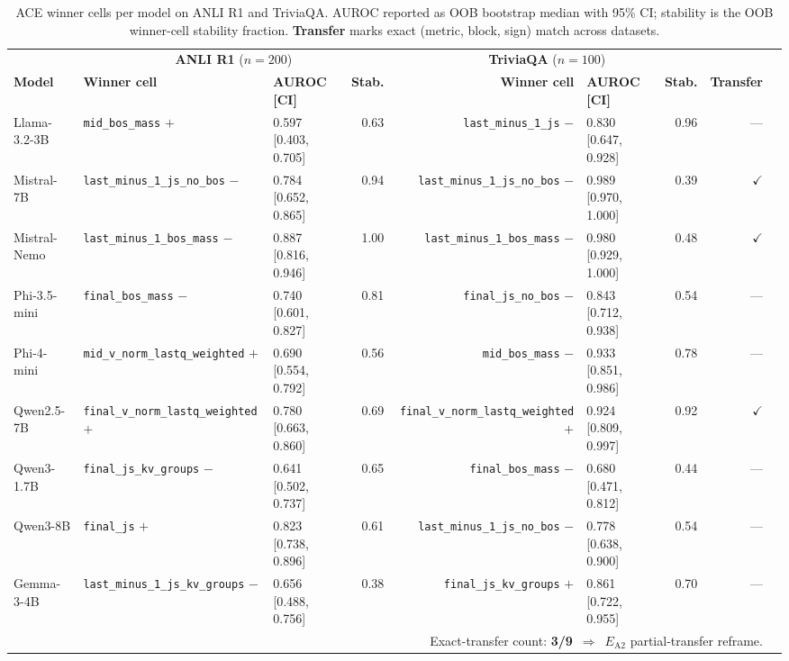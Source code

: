 \documentclass[10pt, letterpaper]{article}
\newcommand{\ea}[1]{$E_{\text{A}#1}$}
\begin{document}
\begin{table}[t]
\centering
\caption{ACE winner cells per model on ANLI R1 and TriviaQA. AUROC
reported as OOB bootstrap median with 95\% CI; stability is the OOB
winner-cell stability fraction. \textbf{Transfer} marks exact
(metric, block, sign) match across datasets.}
\label{tab:ace_winner_cells}
\small
\setlength{\tabcolsep}{4pt}
\begin{tabular}{@{}lllrrlrrc@{}}
\toprule
 & \multicolumn{3}{c}{\textbf{ANLI R1} ($n{=}200$)} & \multicolumn{3}{c}{\textbf{TriviaQA} ($n{=}100$)} & \\
\cmidrule(lr){2-4} \cmidrule(lr){5-7}
\textbf{Model} & \textbf{Winner cell} & \textbf{AUROC [CI]} & \textbf{Stab.} & \textbf{Winner cell} & \textbf{AUROC [CI]} & \textbf{Stab.} & \textbf{Transfer} \\
\midrule
Llama-3.2-3B & \texttt{mid\_bos\_mass} $+$ & 0.597 [0.403, 0.705] & 0.63 & \texttt{last\_minus\_1\_js} $-$ & 0.830 [0.647, 0.928] & 0.96 & --- \\
Mistral-7B & \texttt{last\_minus\_1\_js\_no\_bos} $-$ & 0.784 [0.652, 0.865] & 0.94 & \texttt{last\_minus\_1\_js\_no\_bos} $-$ & 0.989 [0.970, 1.000] & 0.39 & $\checkmark$ \\
Mistral-Nemo & \texttt{last\_minus\_1\_bos\_mass} $-$ & 0.887 [0.816, 0.946] & 1.00 & \texttt{last\_minus\_1\_bos\_mass} $-$ & 0.980 [0.929, 1.000] & 0.48 & $\checkmark$ \\
Phi-3.5-mini & \texttt{final\_bos\_mass} $-$ & 0.740 [0.601, 0.827] & 0.81 & \texttt{final\_js\_no\_bos} $-$ & 0.843 [0.712, 0.938] & 0.54 & --- \\
Phi-4-mini & \texttt{mid\_v\_norm\_lastq\_weighted} $+$ & 0.690 [0.554, 0.792] & 0.56 & \texttt{mid\_bos\_mass} $-$ & 0.933 [0.851, 0.986] & 0.78 & --- \\
Qwen2.5-7B & \texttt{final\_v\_norm\_lastq\_weighted} $+$ & 0.780 [0.663, 0.860] & 0.69 & \texttt{final\_v\_norm\_lastq\_weighted} $+$ & 0.924 [0.809, 0.997] & 0.92 & $\checkmark$ \\
Qwen3-1.7B & \texttt{final\_js\_kv\_groups} $-$ & 0.641 [0.502, 0.737] & 0.65 & \texttt{final\_bos\_mass} $-$ & 0.680 [0.471, 0.812] & 0.44 & --- \\
Qwen3-8B & \texttt{final\_js} $+$ & 0.823 [0.738, 0.896] & 0.61 & \texttt{last\_minus\_1\_js\_no\_bos} $-$ & 0.778 [0.638, 0.900] & 0.54 & --- \\
Gemma-3-4B & \texttt{last\_minus\_1\_js\_kv\_groups} $-$ & 0.656 [0.488, 0.756] & 0.38 & \texttt{final\_js\_kv\_groups} $+$ & 0.861 [0.722, 0.955] & 0.70 & --- \\
\midrule
\multicolumn{8}{r}{Exact-transfer count: \textbf{3/9} $\,\Rightarrow\,$ \ea{2} partial-transfer reframe.} \\
\bottomrule
\end{tabular}
\end{table}
\end{document}
